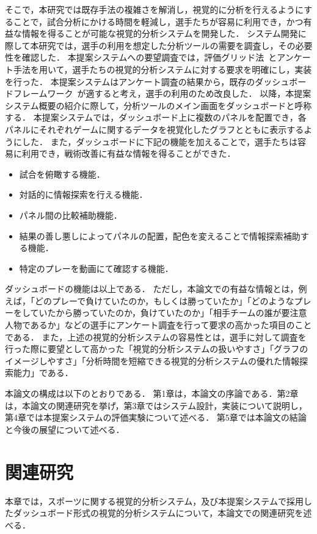\documentclass[sotsuron]{kuee}
\begin{document}
	そこで，本研究では既存手法の複雑さを解消し，視覚的に分析を行えるようにすることで，試合分析にかける時間を軽減し，選手たちが容易に利用でき，かつ有益な情報を得ることが可能な視覚的分析システムを開発した．
	システム開発に際して本研究では，選手の利用を想定した分析ツールの需要を調査し，その必要性を確認した．
	本提案システムへの要望調査では，評価グリッド法~\cite{EGM}とアンケート手法を用いて，選手たちの視覚的分析システムに対する要求を明確にし，実装を行った．
	本提案システムはアンケート調査の結果から，既存のダッシュボードフレームワーク~\cite{dashboard}が適すると考え，選手の利用のため改良した．
	以降，本提案システム概要の紹介に際して，分析ツールのメイン画面をダッシュボードと呼称する．
	本提案システムでは，ダッシュボード上に複数のパネルを配置でき，各パネルにそれぞれゲームに関するデータを視覚化したグラフとともに表示するようにした．
	また，ダッシュボードに下記の機能を加えることで，選手たちは容易に利用でき，戦術改善に有益な情報を得ることができた．
		\begin{itemize}
			\item 試合を俯瞰する機能．
			\item 対話的に情報探索を行える機能．
			\item パネル間の比較補助機能．
			\item 結果の善し悪しによってパネルの配置，配色を変えることで情報探索補助する機能．
			\item 特定のプレーを動画にて確認する機能．
		\end{itemize}
	ダッシュボードの機能は以上である．
	ただし，本論文での有益な情報とは，例えば，「どのプレーで負けていたのか，もしくは勝っていたか」「どのようなプレーをしていたから勝っていたのか，負けていたのか」「相手チームの誰が要注意人物であるか」などの選手にアンケート調査を行って要求の高かった項目のことである．
	また，上述の視覚的分析システムの容易性とは，選手に対して調査を行った際に要望として高かった「視覚的分析システムの扱いやすさ」「グラフのイメージしやすさ」「分析時間を短縮できる視覚的分析システムの優れた情報探索能力」である．
	
	本論文の構成は以下のとおりである．
	第1章は，本論文の序論である．第2章は，本論文の関連研究を挙げ，第3章ではシステム設計，実装について説明し，第4章では本提案システムの評価実験について述べる．
	第5章では本論文の結論と今後の展望について述べる．

\chapter{関連研究}
	本章では，スポーツに関する視覚的分析システム，及び本提案システムで採用したダッシュボード形式の視覚的分析システムについて，本論文での関連研究を述べる．
	
\end{document}
